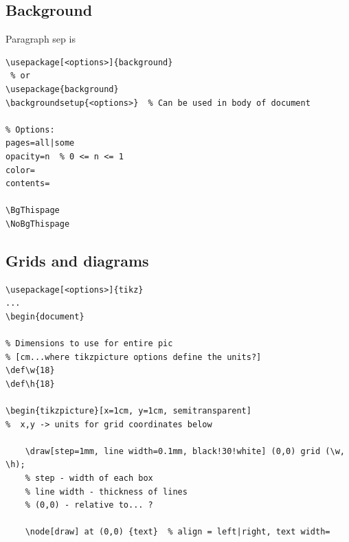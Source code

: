 \documentclass{article}
\begin{document}
\subsection{Background}

Paragraph sep is \the\parskip

\begin{lstlisting}
\usepackage[<options>]{background}
 % or
\usepackage{background}
\backgroundsetup{<options>}  % Can be used in body of document

% Options:
pages=all|some
opacity=n  % 0 <= n <= 1
color=
contents=

\BgThispage
\NoBgThispage
\end{lstlisting}


\subsection{Grids and diagrams}
\begin{lstlisting}
\usepackage[<options>]{tikz}
...
\begin{document}

% Dimensions to use for entire pic
% [cm...where tikzpicture options define the units?]
\def\w{18}
\def\h{18}

\begin{tikzpicture}[x=1cm, y=1cm, semitransparent]
%  x,y -> units for grid coordinates below

    \draw[step=1mm, line width=0.1mm, black!30!white] (0,0) grid (\w, \h);
    % step - width of each box
    % line width - thickness of lines
    % (0,0) - relative to... ?

    \node[draw] at (0,0) {text}  % align = left|right, text width=

\end{lstlisting}
\end{document}
